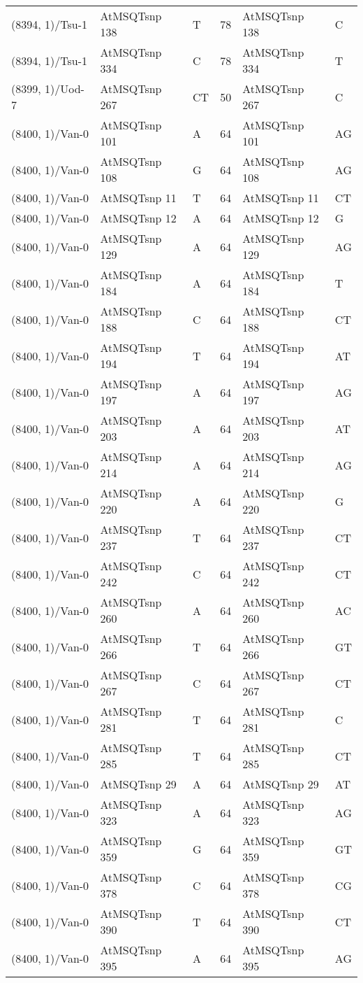 \begin{center}
\begin{longtable}{|l|l|l|l|l|l|}
(8394, 1)/Tsu-1&AtMSQTsnp 138&T&78&AtMSQTsnp 138&C\\
(8394, 1)/Tsu-1&AtMSQTsnp 334&C&78&AtMSQTsnp 334&T\\
(8399, 1)/Uod-7&AtMSQTsnp 267&CT&50&AtMSQTsnp 267&C\\
(8400, 1)/Van-0&AtMSQTsnp 101&A&64&AtMSQTsnp 101&AG\\
(8400, 1)/Van-0&AtMSQTsnp 108&G&64&AtMSQTsnp 108&AG\\
(8400, 1)/Van-0&AtMSQTsnp 11&T&64&AtMSQTsnp 11&CT\\
(8400, 1)/Van-0&AtMSQTsnp 12&A&64&AtMSQTsnp 12&G\\
(8400, 1)/Van-0&AtMSQTsnp 129&A&64&AtMSQTsnp 129&AG\\
(8400, 1)/Van-0&AtMSQTsnp 184&A&64&AtMSQTsnp 184&T\\
(8400, 1)/Van-0&AtMSQTsnp 188&C&64&AtMSQTsnp 188&CT\\
(8400, 1)/Van-0&AtMSQTsnp 194&T&64&AtMSQTsnp 194&AT\\
(8400, 1)/Van-0&AtMSQTsnp 197&A&64&AtMSQTsnp 197&AG\\
(8400, 1)/Van-0&AtMSQTsnp 203&A&64&AtMSQTsnp 203&AT\\
(8400, 1)/Van-0&AtMSQTsnp 214&A&64&AtMSQTsnp 214&AG\\
(8400, 1)/Van-0&AtMSQTsnp 220&A&64&AtMSQTsnp 220&G\\
(8400, 1)/Van-0&AtMSQTsnp 237&T&64&AtMSQTsnp 237&CT\\
(8400, 1)/Van-0&AtMSQTsnp 242&C&64&AtMSQTsnp 242&CT\\
(8400, 1)/Van-0&AtMSQTsnp 260&A&64&AtMSQTsnp 260&AC\\
(8400, 1)/Van-0&AtMSQTsnp 266&T&64&AtMSQTsnp 266&GT\\
(8400, 1)/Van-0&AtMSQTsnp 267&C&64&AtMSQTsnp 267&CT\\
(8400, 1)/Van-0&AtMSQTsnp 281&T&64&AtMSQTsnp 281&C\\
(8400, 1)/Van-0&AtMSQTsnp 285&T&64&AtMSQTsnp 285&CT\\
(8400, 1)/Van-0&AtMSQTsnp 29&A&64&AtMSQTsnp 29&AT\\
(8400, 1)/Van-0&AtMSQTsnp 323&A&64&AtMSQTsnp 323&AG\\
(8400, 1)/Van-0&AtMSQTsnp 359&G&64&AtMSQTsnp 359&GT\\
(8400, 1)/Van-0&AtMSQTsnp 378&C&64&AtMSQTsnp 378&CG\\
(8400, 1)/Van-0&AtMSQTsnp 390&T&64&AtMSQTsnp 390&CT\\
(8400, 1)/Van-0&AtMSQTsnp 395&A&64&AtMSQTsnp 395&AG\\

\end{longtable}
\end{center}
